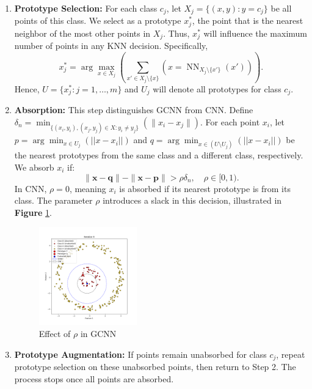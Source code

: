 \begin{enumerate}
	\item \textbf{Prototype Selection:} For each class $c_j$, let $X_j = \{ (x, y) : y = c_j\}$ be all points of this class. We select as a prototype $x_j^*$, the point that is the nearest neighbor of the most other points in $X_j$. Thus, $x_j^*$ will influence the maximum number of points in any KNN decision. Specifically,
	$$
	x_j^* = \arg\max_{x \in X_j} \left( \sum_{x' \in X_j \setminus \{x\}}\left(x = \operatorname{NN}_{X_j \setminus \{x'\}}(x')\right) \right).
	$$
	Hence, $U = \{ x_j^* : j = 1, \ldots, m \}$ and $U_j$ will denote all prototypes for class $c_j$.
	
	\item \textbf{Absorption:} This step distinguishes GCNN from CNN. Define $\delta_n = \min_{\{ (x_i, y_i), (x_j, y_j) \in X : y_i \neq y_j\}} \left( \|x_i - x_j\| \right)$. For each point $x_i$, let $p = \arg\min_{x \in U_j} \left( ||x - x_i|| \right)$ and $q = \arg\min_{x \in (U \setminus U_j)} \left( ||x - x_i|| \right)$ be the nearest prototypes from the same class and a different class, respectively. We absorb $x_i$ if:
	$$
	\| \mathbf{x} - \mathbf{q} \| - \| \mathbf{x} - \mathbf{p} \| > \rho \delta_n, \quad \rho \in [0, 1).
	$$
	In CNN, $\rho = 0$, meaning $x_i$ is absorbed if its nearest prototype is from its class. The parameter $\rho$ introduces a slack in this decision, illustrated in \textbf{Figure} \ref{fig:gcnnRhoIllustration}.
	
	\begin{figure}[ht]
		\centering
		\includegraphics[width=0.4\textwidth]{figures/gcnn/gcnnRhoIllustration}
		\caption{Effect of $\rho$ in GCNN}
		\label{fig:gcnnRhoIllustration}
	\end{figure}
	
	\item \textbf{Prototype Augmentation:} If points remain unabsorbed for class $c_j$, repeat prototype selection on these unabsorbed points, then return to Step 2. The process stops once all points are absorbed.
\end{enumerate}

